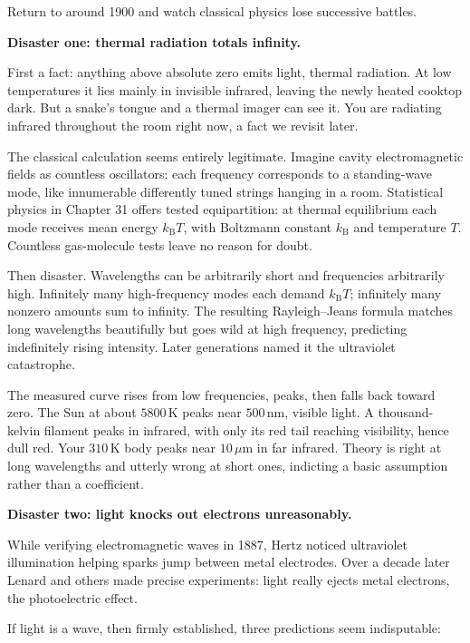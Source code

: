 
Return to around 1900 and watch classical physics lose successive battles.

\textbf{Disaster one: thermal radiation totals infinity.}

First a fact: anything above absolute zero emits light, thermal radiation. At low temperatures it lies mainly in invisible infrared, leaving the newly heated cooktop dark. But a snake's tongue and a thermal imager can see it. You are radiating infrared throughout the room right now, a fact we revisit later.

The classical calculation seems entirely legitimate. Imagine cavity electromagnetic fields as countless oscillators: each frequency corresponds to a standing-wave mode, like innumerable differently tuned strings hanging in a room. Statistical physics in Chapter 31 offers tested equipartition: at thermal equilibrium each mode receives mean energy \(k_{\mathrm{B}}T\), with Boltzmann constant \(k_{\mathrm{B}}\) and temperature \(T\). Countless gas-molecule tests leave no reason for doubt.

Then disaster. Wavelengths can be arbitrarily short and frequencies arbitrarily high. Infinitely many high-frequency modes each demand \(k_{\mathrm{B}}T\); infinitely many nonzero amounts sum to infinity. The resulting Rayleigh--Jeans formula matches long wavelengths beautifully but goes wild at high frequency, predicting indefinitely rising intensity. Later generations named it the ultraviolet catastrophe.

The measured curve rises from low frequencies, peaks, then falls back toward zero. The Sun at about \(5800\,\mathrm{K}\) peaks near \(500\,\mathrm{nm}\), visible light. A thousand-kelvin filament peaks in infrared, with only its red tail reaching visibility, hence dull red. Your \(310\,\mathrm{K}\) body peaks near \(10\,\mu\mathrm{m}\) in far infrared. Theory is right at long wavelengths and utterly wrong at short ones, indicting a basic assumption rather than a coefficient.

\textbf{Disaster two: light knocks out electrons unreasonably.}

While verifying electromagnetic waves in 1887, Hertz noticed ultraviolet illumination helping sparks jump between metal electrodes. Over a decade later Lenard and others made precise experiments: light really ejects metal electrons, the photoelectric effect.

If light is a wave, then firmly established, three predictions seem indisputable:

